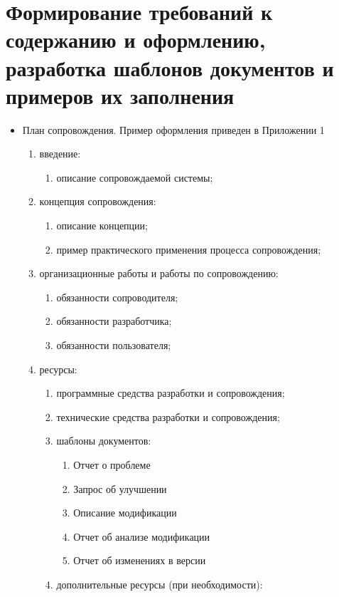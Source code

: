 
\pagebreak


\section{Формирование требований к содержанию и оформлению, разработка шаблонов документов и примеров их заполнения}

\begin{itemize}
    \item План сопровождения.
    Пример оформления приведен в Приложении 1
    \begin{enumerate}
        \item введение:
        \begin{enumerate}
            \item описание сопровождаемой системы;
        \end{enumerate}
        \item концепция сопровождения:
        \begin{enumerate}
            \item описание концепции;
            \item пример практического применения процесса сопровождения;
        \end{enumerate}

        \item организационные работы и работы по сопровождению:
        \begin{enumerate}
            \item обязанности сопроводителя;
            \item обязанности разработчика;
            \item обязанности пользователя;
        \end{enumerate}

        \item ресурсы:
        \begin{enumerate}
            \item программные средства разработки и сопровождения;
            \item технические средства разработки и сопровождения;
            \item шаблоны документов:
            \begin{enumerate}
                \item Отчет о проблеме
                \item Запрос об улучшении
                \item Описание модификации
                \item Отчет об анализе модификации
                \item Отчет об изменениях в версии
            \end{enumerate}
            \item дополнительные ресурсы (при необходимости):
        \end{enumerate}


\end{enumerate}
\end{itemize}
